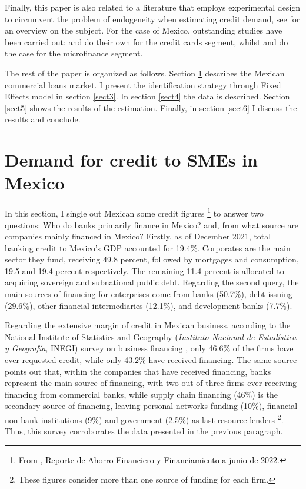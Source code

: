 \documentclass[11pt, oneside]{book}
\let\oldfootnote\footnote %
\renewcommand\footnote[1]{%
\oldfootnote{\hspace{0.05mm}#1}}
\begin{document}
Finally, this paper is also related to a literature that employs experimental design to circumvent the problem of endogeneity when estimating credit demand, see  \cite{banerjee2015six} for an overview on the subject. For the case of Mexico, outstanding studies have been carried out: \cite{ponce2017borrowing} and \cite{seira2015bancarizing} do their own for the credit cards segment, whilst \cite{angelucci2015microcredit}  and  \cite{karlan2019long} do the case for the microfinance segment. 

The rest of the paper is organized as follows. Section \ref{sect2} describes the Mexican commercial loans market. I present the identification strategy through Fixed Effects model in section \ref{sect3}. In section \ref{sect4} the data is described. Section \ref{sect5} shows the results of the estimation. Finally, in section \ref{sect6} I discuss the results and conclude. 


\chapter{Demand for credit to SMEs in Mexico} \label{sect2}

In this section, I single out Mexican some credit figures\footnote{From \cite{CNBV2022reporte}, \href{https://www.gob.mx/cnbv/articulos/reporte-de-ahorro-financiero-y-financiamiento-a-junio-de-2022?idiom=es}{\textcolor{black}{Reporte de Ahorro Financiero y Financiamiento a junio de 2022.}}
} to answer two questions:  Who do banks primarily finance in Mexico? and, from what source are companies mainly financed in Mexico? Firstly, as of December 2021, total banking credit to Mexico's GDP accounted for 19.4\%. Corporates are the main sector they fund, receiving 49.8 percent, followed by mortgages and consumption, 19.5 and 19.4 percent respectively. The remaining 11.4 percent is allocated to acquiring sovereign and subnational public debt. Regarding the second query, the main sources of financing for enterprises come from banks (50.7\%), debt issuing (29.6\%), other financial intermediaries (12.1\%), and development banks (7.7\%).

Regarding the extensive margin of credit in Mexican business, according to the National Institute of Statistics and Geography (\textit{Instituto Nacional de Estad\'istica y Geograf\'ia}, INEGI) survey on business financing \citep{INEGI2021enafin}, only 46.6\% of the firms have ever requested credit, while only 43.2\% have received financing. The same source points out that, within the companies that have received financing, banks represent the main source of financing, with two out of three firms ever receiving financing from commercial banks, while supply chain financing (46\%) is the secondary source of financing, leaving personal networks funding (10\%), financial non-bank institutions (9\%) and government (2.5\%) as last resource lenders\footnote{These figures consider more than one source of funding for each firm.}. Thus, this survey corroborates the data presented in the previous paragraph. 
\end{document}
